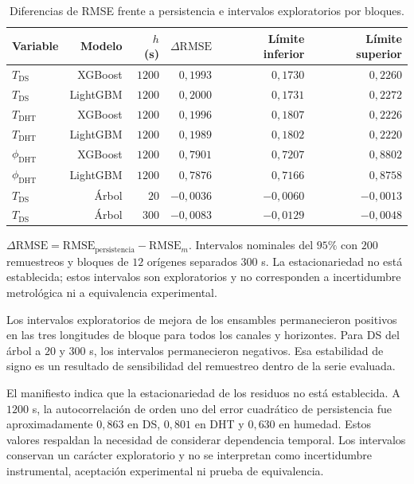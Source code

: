 \begin{table}[htbp]
\centering
\caption{Diferencias de RMSE frente a persistencia e intervalos exploratorios por bloques.}
\label{tab:res_intervalos}
\small
\setlength{\tabcolsep}{5pt}
\begin{tabular}{lrrrrr}
\toprule
Variable & Modelo & $h$ (s) & $\Delta\mathrm{RMSE}$ & Límite inferior & Límite superior \\
\midrule
$T_{\mathrm{DS}}$ & XGBoost & $1200$ & $0{,}1993$ & $0{,}1730$ & $0{,}2260$ \\
$T_{\mathrm{DS}}$ & LightGBM & $1200$ & $0{,}2000$ & $0{,}1731$ & $0{,}2272$ \\
$T_{\mathrm{DHT}}$ & XGBoost & $1200$ & $0{,}1996$ & $0{,}1807$ & $0{,}2226$ \\
$T_{\mathrm{DHT}}$ & LightGBM & $1200$ & $0{,}1989$ & $0{,}1802$ & $0{,}2220$ \\
$\phi_{\mathrm{DHT}}$ & XGBoost & $1200$ & $0{,}7901$ & $0{,}7207$ & $0{,}8802$ \\
$\phi_{\mathrm{DHT}}$ & LightGBM & $1200$ & $0{,}7876$ & $0{,}7166$ & $0{,}8758$ \\
$T_{\mathrm{DS}}$ & Árbol & $20$ & $-0{,}0036$ & $-0{,}0060$ & $-0{,}0013$ \\
$T_{\mathrm{DS}}$ & Árbol & $300$ & $-0{,}0083$ & $-0{,}0129$ & $-0{,}0048$ \\
\bottomrule
\end{tabular}
\par\vspace{3pt}
\begin{minipage}{0.98\textwidth}\footnotesize
$\Delta\mathrm{RMSE}=\mathrm{RMSE}_{\mathrm{persistencia}}-\mathrm{RMSE}_{m}$. Intervalos nominales del $95\%$ con $200$ remuestreos y bloques de $12$ orígenes separados $300$ s. La estacionariedad no está establecida; estos intervalos son exploratorios y no corresponden a incertidumbre metrológica ni a equivalencia experimental.
\end{minipage}
\end{table}


Los intervalos exploratorios de mejora de los ensambles permanecieron positivos en las tres longitudes de bloque para todos los canales y horizontes. Para DS del árbol a $20$ y $300$ s, los intervalos permanecieron negativos. Esa estabilidad de signo es un resultado de sensibilidad del remuestreo dentro de la serie evaluada.

El manifiesto indica que la estacionariedad de los residuos no está establecida. A $1200$ s, la autocorrelación de orden uno del error cuadrático de persistencia fue aproximadamente $0{,}863$ en DS, $0{,}801$ en DHT y $0{,}630$ en humedad. Estos valores respaldan la necesidad de considerar dependencia temporal. Los intervalos conservan un carácter exploratorio y no se interpretan como incertidumbre instrumental, aceptación experimental ni prueba de equivalencia.

